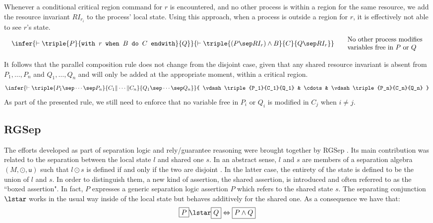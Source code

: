 Whenever a conditional critical region command for $r$ is encountered, and no other process is within a region for the same resource, we add the resource invariant $RI_{r_i}$ to the process' local state. Using this approach, when a process is outside a region for $r$, it is effectively not able to see $r$'s state.
\[
	\begin{array}{c c}
		\begin{array}{c}
		\infer
		{
			\vdash \triple
			{P}
			{\texttt{with } r \texttt{ when } B \texttt{ do } C \texttt{ endwith}}
			{Q}
		}
		{
			\vdash \triple
			{(P \sep RI_r) \land B}
			{C}
			{Q \sep RI_r}
		}
		\end{array}
		&
		\begin{array}{l}
			\text{No other process modifies} \\
			\text{variables free in $P$ or $Q$}
		\end{array}
	\end{array}
\]

It follows that the parallel composition rule does not change from the disjoint case, given that any shared resource invariant is absent from $P_1, \ldots, P_n$ and $Q_1, \ldots, Q_n$ and will only be added at the appropriate moment, within a critical region.
\[
	\infer
	{
		\vdash \triple
		{P_1 \sep \cdots \sep P_n}
		{C_1 \| \cdots \| C_n}
		{Q_1 \sep \cdots \sep Q_n}
	}
	{
		\vdash \triple
		{P_1}{C_1}{Q_1} &
		\cdots &
		\vdash \triple
		{P_n}{C_n}{Q_n}
	}
\]
As part of the presented rule, we still need to enforce that no variable free in $P_i$ or $Q_i$ is modified in $C_j$ when $i \neq j$.

\tocless\subsection{RGSep} \label{rgsep}

The efforts developed as part of separation logic and rely/guarantee reasoning were brought together by RGSep \cite{viktor}. Its main contribution was related to the separation between the local state $l$ and shared one $s$. In an abstract sense, $l$ and $s$ are members of a separation algebra $(M, \odot, \mathsf{u})$ such that $l \odot s$ is defined if and only if the two are disjoint \cite{sepalgebra}. In the latter case, the entirety of the state is defined to be the union of $l$ and $s$. In order to distinguish them, a new kind of assertion, the shared assertion, is introduced and often referred to as the ``boxed assertion". In fact, $\boxed{P}$ expresses a generic separation logic assertion $P$ which refers to the shared state $s$. The separating conjunction $\lstar$ works in the usual way inside of the local state but behaves additively for the shared one. As a consequence we have that:
\[
	\boxed{P} \lstar \boxed{Q} \Leftrightarrow \boxed{P \land Q}
\]

